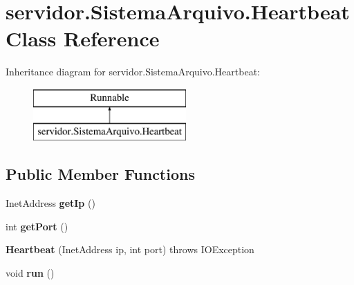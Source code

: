 \hypertarget{classservidor_1_1_sistema_arquivo_1_1_heartbeat}{\section{servidor.\+Sistema\+Arquivo.\+Heartbeat Class Reference}
\label{classservidor_1_1_sistema_arquivo_1_1_heartbeat}
}
Inheritance diagram for servidor.\+Sistema\+Arquivo.\+Heartbeat\+:\begin{figure}[H]
\begin{center}
\leavevmode
\includegraphics[height=2.000000cm]{classservidor_1_1_sistema_arquivo_1_1_heartbeat}
\end{center}
\end{figure}
\subsection*{Public Member Functions}
\begin{DoxyCompactItemize}
\item 
\hypertarget{classservidor_1_1_sistema_arquivo_1_1_heartbeat_ac20c759b24a8d0a0582b3f2f09844aac}{Inet\+Address {\bfseries get\+Ip} ()}\label{classservidor_1_1_sistema_arquivo_1_1_heartbeat_ac20c759b24a8d0a0582b3f2f09844aac}

\item 
\hypertarget{classservidor_1_1_sistema_arquivo_1_1_heartbeat_a42df0521bac88f23c79216595668b660}{int {\bfseries get\+Port} ()}\label{classservidor_1_1_sistema_arquivo_1_1_heartbeat_a42df0521bac88f23c79216595668b660}

\item 
\hypertarget{classservidor_1_1_sistema_arquivo_1_1_heartbeat_a8e9a74a8bdb6d218c2878b89e9f3096e}{{\bfseries Heartbeat} (Inet\+Address ip, int port)  throws I\+O\+Exception }\label{classservidor_1_1_sistema_arquivo_1_1_heartbeat_a8e9a74a8bdb6d218c2878b89e9f3096e}

\item 
\hypertarget{classservidor_1_1_sistema_arquivo_1_1_heartbeat_a00ddaefc53c383692a1b49c95471ba83}{void {\bfseries run} ()}\label{classservidor_1_1_sistema_arquivo_1_1_heartbeat_a00ddaefc53c383692a1b49c95471ba83}

\end{DoxyCompactItemize}


